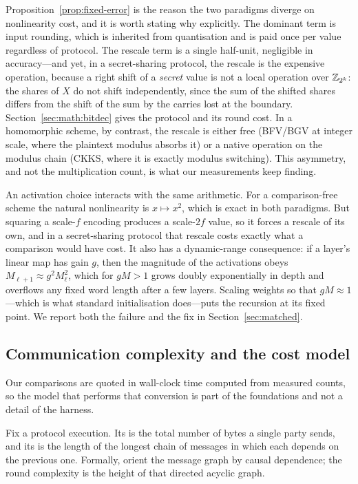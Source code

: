 Proposition~\ref{prop:fixed-error} is the reason the two paradigms diverge on
nonlinearity cost, and it is worth stating why explicitly. The dominant term is
input rounding, which is inherited from quantisation and is paid once per value
regardless of protocol. The rescale term is a single half-unit, negligible in
accuracy---and yet, in a secret-sharing protocol, the rescale is the expensive
operation, because a right shift of a \emph{secret} value is not a local
operation over $\mathbb{Z}_{2^k}$: the shares of $X$ do not shift independently, since
the sum of the shifted shares differs from the shift of the sum by the carries
lost at the boundary. Section~\ref{sec:math:bitdec} gives the protocol and its
round cost. In a homomorphic scheme, by contrast, the rescale is either free
(BFV/BGV at integer scale, where the plaintext modulus absorbs it) or a native
operation on the modulus chain (CKKS, where it is exactly modulus switching).
This asymmetry, and not the multiplication count, is what our measurements keep
finding.

\begin{remark}
\label{rem:x2}
An activation choice interacts with the same arithmetic. For a comparison-free
scheme the natural nonlinearity is $x \mapsto x^2$, which is exact in both
paradigms. But squaring a scale-$f$ encoding produces a scale-$2f$ value, so it
forces a rescale of its own, and in a secret-sharing protocol that rescale costs
exactly what a comparison would have cost. It also has a dynamic-range
consequence: if a layer's linear map has gain $g$, then the magnitude of the
activations obeys $M_{\ell+1} \approx g^2 M_\ell^2$, which for $g M > 1$ grows
doubly exponentially in depth and overflows any fixed word length after a few
layers. Scaling weights so that $gM \approx 1$---which is what standard
initialisation does---puts the recursion at its fixed point. We report both the
failure and the fix in Section~\ref{sec:matched}.
\end{remark}

\subsection{Communication complexity and the cost model}
\label{sec:math:cost}

Our comparisons are quoted in wall-clock time computed from measured counts, so
the model that performs that conversion is part of the foundations and not a detail of the harness.

\begin{definition}
\label{def:roundsbytes}
Fix a protocol execution. Its  is the total number of bytes a
single party sends, and its  is the length of the longest
chain of messages in which each depends on the previous one. Formally, orient the
message graph by causal dependence; the round complexity is the height of that
directed acyclic graph.
\end{definition}

